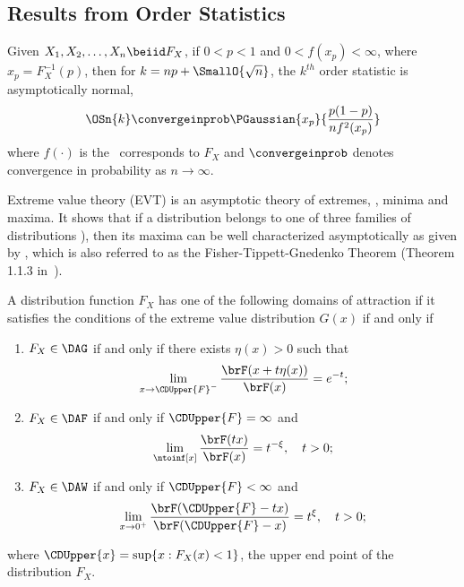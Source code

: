 \subsection{Results from Order Statistics}
\label{sec:central_order_stats}
\begin{thm}
\label{thm:central_order_stats}
Given $X_1, X_2, \allowbreak \ldots, \allowbreak X_n \beiid F_X$, if $0 < p < 1$ and $0 < f(x_p) < \infty$, where $x_p = F_X^{-1}(p)$, then
for $k = np + \SmallO{\sqrt{n}}$, the $k^{th}$ order statistic is asymptotically normal,
\begin{equation*}
    \OSn{k}
    \convergeinprob
    \PGaussian{x_p}{\frac{p(1-p)}{n f^2(x_p)}}
\end{equation*}
where $f(\cdot)$ is the \pdfunc\ corresponds to $F_X$ and $\convergeinprob$ denotes convergence in probability as $n \rightarrow \infty$.
\end{thm}
{Extreme value theory} (EVT) is an asymptotic theory of extremes, \ie, minima and maxima. It shows that if a distribution belongs to one of three families of distributions ), then its maxima can be well characterized asymptotically as given by , which is also referred to as the
Fisher-Tippett-Gnedenko Theorem (Theorem 1.1.3 in~\cite{haan_extreme_2006}).
\begin{thm}
    \label{thm:domain_of_attractions}
    A distribution function $F_X$ has one of the following domains of attraction if it satisfies the conditions of the extreme value
    distribution $G(x)$ if and only if
    \begin{enumerate}
        \item $F_X \in \DAG$ if and only if there exists $\eta(x) > 0$ such that
            \begin{equation*}
                \lim_{x \rightarrow \CDUpper{F}^-} \frac{\brF(x + t \eta(x))}{\brF(x)} = e^{-t};
            \end{equation*}
        \item $F_X \in \DAF$ if and only if $\CDUpper{F} = \infty$ and
            \begin{equation*}
                \lim_{\ntoinf[x]} \frac{\brF(tx)}{\brF(x)} = t^{-\xi}, \quad t > 0;
            \end{equation*}
        \item $F_X \in \DAW$ if and only if $\CDUpper{F} < \infty$ and
            \begin{equation*}
                \lim_{x \rightarrow 0^+} \frac{\brF(\CDUpper{F} - tx)}{\brF(\CDUpper{F} - x)} = t^{\xi}, \quad t > 0;
            \end{equation*}
    \end{enumerate}
    where $\CDUpper{x} = \sup \{ x : F_X(x) < 1 \}$, the upper end point of the distribution $F_X$.
\end{thm}

